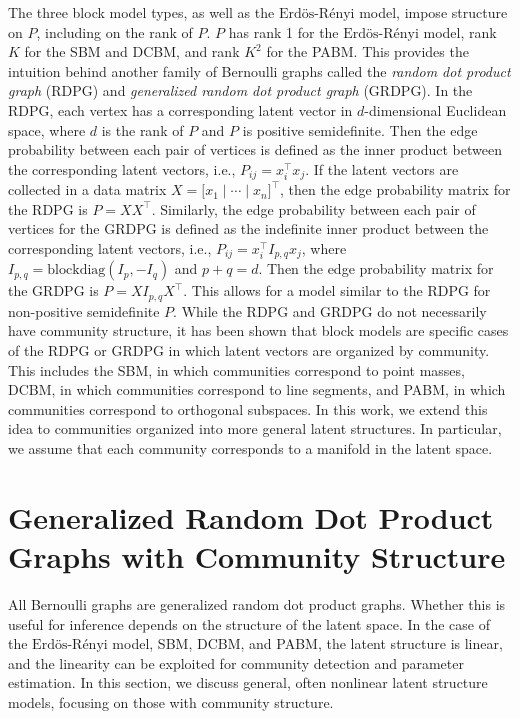 \documentclass[12pt]{article}
\begin{document}
The three block model types, as well as the
\(\text{Erd\"{o}s-R\'{e}nyi}\) model, impose structure on \(P\),
including on the rank of \(P\). \(P\) has rank 1 for the
\(\text{Erd\"{o}s-R\'{e}nyi}\) model, rank \(K\) for the SBM and DCBM,
and rank \(K^2\) for the PABM. This provides the intuition behind
another family of Bernoulli graphs called the \emph{random dot product
graph} (RDPG) and \emph{generalized random dot product graph} (GRDPG).
In the RDPG, each vertex has a corresponding latent vector in
\(d\)-dimensional Euclidean space, where \(d\) is the rank of \(P\) and
\(P\) is positive semidefinite. Then the edge probability between each
pair of vertices is defined as the inner product between the
corresponding latent vectors, i.e., \(P_{ij} = x_i^\top x_j\). If the
latent vectors are collected in a data matrix
\(X = \bigl[ x_1 \mid \cdots \mid x_n \bigr]^\top\), then the edge
probability matrix for the RDPG is \(P = X X^\top\). Similarly, the edge
probability between each pair of vertices for the GRDPG is defined as
the indefinite inner product between the corresponding latent vectors,
i.e., \(P_{ij} = x_i^\top I_{p,q} x_j\), where
\(I_{p,q} = \mathrm{blockdiag}(I_p, -I_q)\) and \(p + q = d\). Then the
edge probability matrix for the GRDPG is \(P = X I_{p,q} X^\top\). This
allows for a model similar to the RDPG for non-positive semidefinite
\(P\). While the RDPG and GRDPG do not necessarily have community
structure, it has been shown that block models are specific cases of the
RDPG or GRDPG in which latent vectors are organized by community. This
includes the SBM, in which communities correspond to point masses, DCBM,
in which communities correspond to line segments, and PABM, in which
communities correspond to orthogonal subspaces. In this work, we extend
this idea to communities organized into more general latent structures.
In particular, we assume that each community corresponds to a manifold
in the latent space.

\hypertarget{generalized-random-dot-product-graphs-with-community-structure}{%
\section{Generalized Random Dot Product Graphs with Community
Structure}\label{generalized-random-dot-product-graphs-with-community-structure}}

All Bernoulli graphs are generalized random dot product graphs. Whether
this is useful for inference depends on the structure of the latent
space. In the case of the \(\text{Erd\"{o}s-R\'{e}nyi}\) model, SBM,
DCBM, and PABM, the latent structure is linear, and the linearity can be
exploited for community detection and parameter estimation. In this
section, we discuss general, often nonlinear latent structure models,
focusing on those with community structure.
\end{document}

